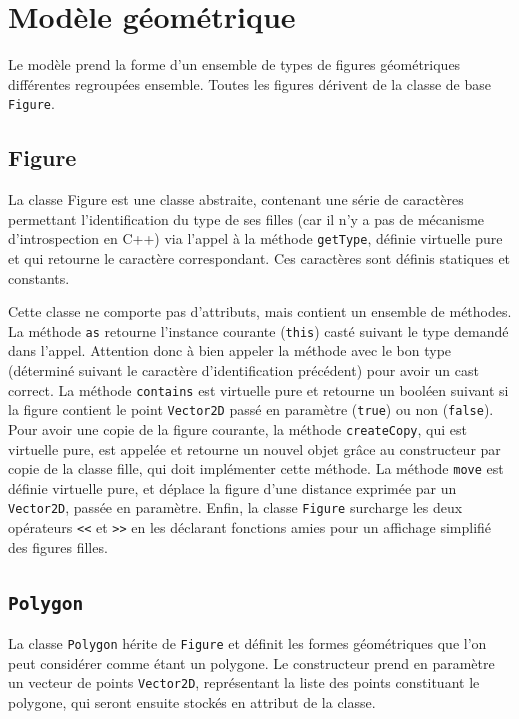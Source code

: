 \documentclass[11pt,a4paper]{article}
\begin{document}
	\section{Modèle géométrique}
	Le modèle prend la forme d'un ensemble de types de figures géométriques différentes regroupées ensemble. Toutes les figures dérivent de la classe de base \texttt{Figure}.
	
	\subsection{Figure}
	La classe Figure est une classe abstraite, contenant une série de caractères permettant l'identification du type de ses filles (car il n'y a pas de mécanisme d'introspection en C++) via l'appel à la méthode \texttt{getType}, définie virtuelle pure et qui retourne le caractère correspondant. Ces caractères sont définis statiques et constants.
	
	Cette classe ne comporte pas d'attributs, mais contient un ensemble de méthodes. La méthode \texttt{as} retourne l'instance courante (\texttt{this}) casté suivant le type demandé dans l'appel. Attention donc à bien appeler la méthode avec le bon type (déterminé suivant le caractère d'identification précédent) pour avoir un cast correct. La méthode \texttt{contains} est virtuelle pure et retourne un booléen suivant si la figure contient le point \texttt{Vector2D} passé en paramètre (\texttt{true}) ou non (\texttt{false}). Pour avoir une copie de la figure courante, la méthode \texttt{createCopy}, qui est virtuelle pure, est appelée et retourne un nouvel objet grâce au constructeur par copie de la classe fille, qui doit implémenter cette méthode. La méthode \texttt{move} est définie virtuelle pure, et déplace la figure d'une distance exprimée par un \texttt{Vector2D}, passée en paramètre. Enfin, la classe \texttt{Figure} surcharge les deux opérateurs \texttt{<<} et \texttt{>>} en les déclarant fonctions amies pour un affichage simplifié des figures filles.
	
	\subsection{\texttt{Polygon}}
	La classe \texttt{Polygon} hérite de \texttt{Figure} et définit les formes géométriques que l'on peut considérer comme étant un polygone. Le constructeur prend en paramètre un vecteur de points \texttt{Vector2D}, représentant la liste des points constituant le polygone, qui seront ensuite stockés en attribut de la classe.
	
\end{document}
